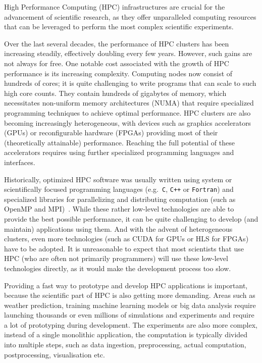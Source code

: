 High Performance Computing (HPC) infrastructures are crucial for the advancement of scientific
research, as they offer unparalleled computing resources that can be leveraged to perform the most
complex scientific experiments.

Over the last several decades, the performance of HPC clusters has been increasing steadily,
effectively doubling every few years. However, such gains are not always for free. One notable cost
associated with the growth of HPC performance is its increasing complexity. Computing nodes now
consist of hundreds of cores; it is quite challenging to write programs that can scale to such
high core counts. They contain hundreds of gigabytes of memory, which necessitates non-uniform
memory architectures (NUMA) that require specialized programming techniques to achieve optimal
performance. HPC clusters are also becoming increasingly heterogeneous, with devices such as
graphics accelerators (GPUs) or reconfigurable hardware (FPGAs) providing most of their
(theoretically attainable) performance. Reaching the full potential of these accelerators requires
using further specialized programming languages and interfaces.

Historically, optimized HPC software was usually written using system or scientifically focused
programming languages (e.g.~\texttt{C}, \texttt{C++} or \texttt{Fortran}) and specialized libraries
for parallelizing and distributing computation (such as OpenMP and MPI)~\cite{mpistudy}. While
these rather low-level technologies are able to provide the best possible performance, it can be
quite challenging to develop (and maintain) applications using them. And with the advent of
heterogeneous clusters, even more technologies (such as CUDA for GPUs or HLS for FPGAs) have to
be adopted. It is unreasonable to expect that most scientists that use HPC (who are often not
primarily programmers) will use these low-level technologies directly, as it would make the
development process too slow.

Providing a fast way to prototype and develop HPC applications is important, because the scientific
part of HPC is also getting more demanding. Areas such as weather prediction, training machine
learning models or big data analysis require launching thousands or even millions of simulations
and experiments and require a lot of prototyping during development. The experiments are also more
complex, instead of a single monolithic application, the computation is typically divided into
multiple steps, such as data ingestion, preprocessing, actual computation, postprocessing,
visualisation etc.

